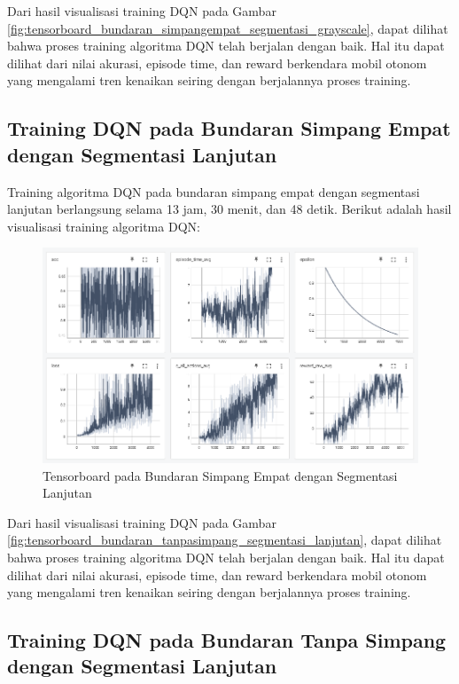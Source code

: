 \documentclass[conference]{IEEEtran}
\begin{document}
	Dari hasil visualisasi training DQN pada Gambar \ref{fig:tensorboard_bundaran_simpangempat_segmentasi_grayscale}, dapat dilihat bahwa proses training algoritma DQN telah berjalan dengan baik. Hal itu dapat dilihat dari nilai akurasi, episode time, dan reward berkendara mobil otonom yang mengalami tren kenaikan seiring dengan berjalannya proses training.
	
	\subsection{Training DQN pada Bundaran Simpang Empat dengan Segmentasi Lanjutan}
	\label{sec:training_dqn_bundaran_simpangempat_segmentasi_hitam_putih}
	
	Training algoritma DQN pada bundaran simpang empat dengan segmentasi lanjutan berlangsung selama 13 jam, 30 menit, dan 48 detik. Berikut adalah hasil visualisasi training algoritma DQN:
	
	\begin{figure}[H] 
		\centering
		\includegraphics[width=1\linewidth]{images/tensorboard_bunderan_segmented}
		\caption{Tensorboard pada Bundaran Simpang Empat dengan Segmentasi Lanjutan}
		\label{fig:tensorboard_bundaran_simpangempat_segmentasi_lanjutan}
	\end{figure}
	
	Dari hasil visualisasi training DQN pada Gambar \ref{fig:tensorboard_bundaran_tanpasimpang_segmentasi_lanjutan}, dapat dilihat bahwa proses training algoritma DQN telah berjalan dengan baik. Hal itu dapat dilihat dari nilai akurasi, episode time, dan reward berkendara mobil otonom yang mengalami tren kenaikan seiring dengan berjalannya proses training.
	
	
	\subsection{Training DQN pada Bundaran Tanpa Simpang dengan Segmentasi Lanjutan}
	\label{sec:training_dqn_bundaran_nosimpang_segmentasi_hitam_putih}
	
\end{document}
